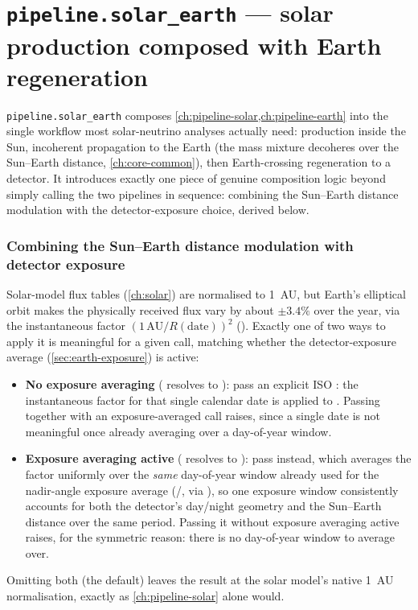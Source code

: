 \chapter{\texttt{pipeline.solar\_earth} --- solar production composed with Earth regeneration}
\label{ch:pipeline-solar-earth}

\texttt{pipeline.solar\_earth} composes \cref{ch:pipeline-solar,ch:pipeline-earth}
into the single workflow most solar-neutrino analyses actually need:
production inside the Sun, incoherent propagation to the Earth (the mass
mixture decoheres over the Sun--Earth distance, \cref{ch:core-common}),
then Earth-crossing regeneration to a detector. It introduces exactly one
piece of genuine composition logic beyond simply calling the two pipelines
in sequence: combining the Sun--Earth distance modulation with the
detector-exposure choice, derived below.

\begin{theorybox}
\subsection*{Combining the Sun--Earth distance modulation with detector exposure}
Solar-model flux tables (\cref{ch:solar}) are normalised to 1~AU, but
Earth's elliptical orbit makes the physically received flux vary by about
$\pm3.4\%$ over the year, via the instantaneous factor
$(1\,\mathrm{AU}/R(\text{date}))^2$
(). Exactly one
of two ways to apply it is meaningful for a given call, matching whether
the detector-exposure average (\cref{sec:earth-exposure}) is active:
\begin{itemize}
  \item \textbf{No exposure averaging} ( resolves
    to ): pass an explicit ISO : the
    instantaneous factor for that single calendar date is applied to
    . Passing  together with an
    exposure-averaged call raises, since a single date is not meaningful
    once already averaging over a day-of-year window.
  \item \textbf{Exposure averaging active} (
    resolves to ): pass 
    instead, which averages the factor uniformly over the \emph{same}
    day-of-year window already used for the nadir-angle exposure average
    (/, via
    ), so one exposure window
    consistently accounts for both the detector's day/night geometry and
    the Sun--Earth distance over the same period. Passing it without
    exposure averaging active raises, for the symmetric reason: there is no
    day-of-year window to average over.
\end{itemize}
Omitting both (the default) leaves the result at the solar model's native
1~AU normalisation, exactly as \cref{ch:pipeline-solar} alone would.
\end{theorybox}

